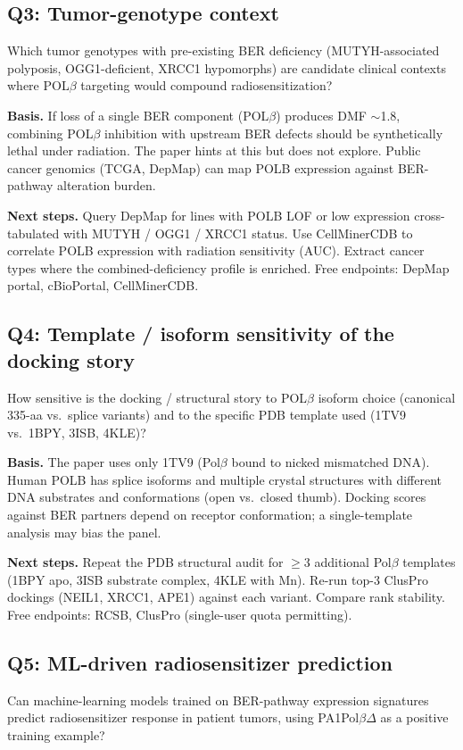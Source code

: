 \subsection{Q3: Tumor-genotype context}
Which tumor genotypes with pre-existing BER deficiency (MUTYH-associated polyposis, OGG1-deficient, XRCC1 hypomorphs) are candidate clinical contexts where POL$\beta$ targeting would compound radiosensitization?

\textbf{Basis.} If loss of a single BER component (POL$\beta$) produces DMF $\sim$1.8, combining POL$\beta$ inhibition with upstream BER defects should be synthetically lethal under radiation. The paper hints at this but does not explore. Public cancer genomics (TCGA, DepMap) can map POLB expression against BER-pathway alteration burden.

\textbf{Next steps.} Query DepMap for lines with POLB LOF or low expression cross-tabulated with MUTYH / OGG1 / XRCC1 status. Use CellMinerCDB to correlate POLB expression with radiation sensitivity (AUC). Extract cancer types where the combined-deficiency profile is enriched. Free endpoints: DepMap portal, cBioPortal, CellMinerCDB.

\subsection{Q4: Template / isoform sensitivity of the docking story}
How sensitive is the docking / structural story to POL$\beta$ isoform choice (canonical 335-aa vs.\ splice variants) and to the specific PDB template used (1TV9 vs.\ 1BPY, 3ISB, 4KLE)?

\textbf{Basis.} The paper uses only 1TV9 (Pol$\beta$ bound to nicked mismatched DNA). Human POLB has splice isoforms and multiple crystal structures with different DNA substrates and conformations (open vs.\ closed thumb). Docking scores against BER partners depend on receptor conformation; a single-template analysis may bias the panel.

\textbf{Next steps.} Repeat the PDB structural audit for $\geq$3 additional Pol$\beta$ templates (1BPY apo, 3ISB substrate complex, 4KLE with Mn). Re-run top-3 ClusPro dockings (NEIL1, XRCC1, APE1) against each variant. Compare rank stability. Free endpoints: RCSB, ClusPro (single-user quota permitting).

\subsection{Q5: ML-driven radiosensitizer prediction}
Can machine-learning models trained on BER-pathway expression signatures predict radiosensitizer response in patient tumors, using PA1Pol$\beta\Delta$ as a positive training example?

